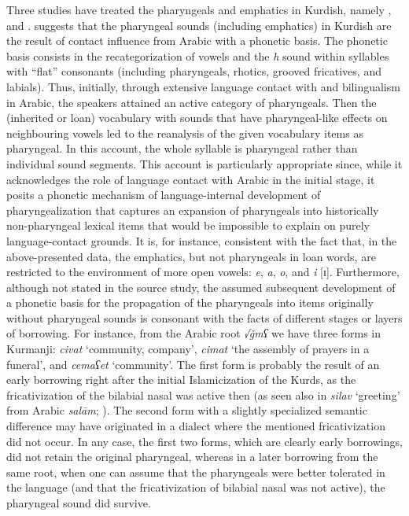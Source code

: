 \documentclass[output=paper]{langsci/langscibook}
\begin{document}
Three studies have treated the pharyngeals and emphatics in Kurdish, namely \citet{Kahn1976}, \citet{Anonbyforthcoming} and \citet{Barryforthcoming}. \citet{Barryforthcoming} suggests that the pharyngeal sounds (including emphatics) in Kurdish are the result of contact influence from Arabic with a phonetic basis. The phonetic basis consists in the recategorization of vowels and the \textit{h} sound within syllables with “flat” consonants (including pharyngeals, rhotics, grooved fricatives, and labials). Thus, initially, through extensive language contact with and bilingualism in Arabic, the speakers attained an active category of pharyngeals. Then the (inherited or loan) vocabulary with sounds that have pharyngeal-like effects on neighbouring vowels led to the reanalysis of the given vocabulary items as pharyngeal. In this account, the whole syllable is pharyngeal rather than individual sound segments. This account is particularly appropriate since, while it acknowledges the role of language contact with Arabic in the initial stage, it posits a phonetic mechanism of language-internal development of pharyngealization that captures an expansion of pharyngeals into historically non-pharyngeal lexical items that would be impossible to explain on purely language-contact grounds. It is, for instance, consistent with the fact that, in the above-presented data, the emphatics, but not pharyngeals in loan words, are restricted to the environment of more open vowels: \textit{e}, \textit{a}, \textit{o}, and \textit{i} [ɪ]. Furthermore, although not stated in the source study, the assumed subsequent development of a phonetic basis for the propagation of the pharyngeals into items originally without pharyngeal sounds is consonant with the facts of different stages or layers of borrowing. For instance, from the Arabic root \textit{√ǧmʕ} we have three forms in Kurmanji: \textit{civat} ‘community, company’, \textit{cimat} ‘the assembly of prayers in a funeral’, and \textit{cemaʕet} ‘community’. The first form is probably the result of an early borrowing right after the  initial Islamicization of the Kurds, as the fricativization of the bilabial nasal was active then (as seen also in \textit{silav} ‘greeting’ from Arabic \textit{salām}; \citealt{Paul2008}). The second form with a slightly specialized semantic difference may have originated in a dialect where the mentioned fricativization did not occur. In any case, the first two forms, which are clearly early borrowings, did not retain the original pharyngeal, whereas in a later borrowing from the same root, when one can assume that the pharyngeals were better tolerated in the language (and that the fricativization of bilabial nasal was not active), the pharyngeal sound did survive.   
\end{document}
